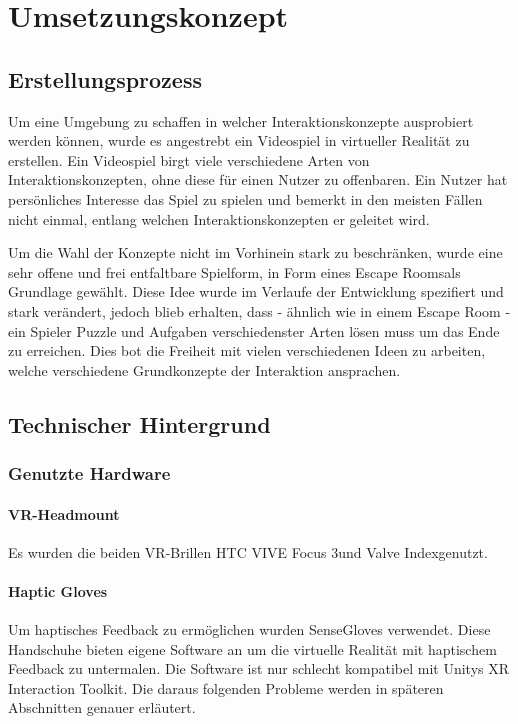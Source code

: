 \chapter{Umsetzungskonzept}

\section{Erstellungsprozess}
Um eine Umgebung zu schaffen in welcher Interaktionskonzepte ausprobiert werden können, wurde es angestrebt ein Videospiel in virtueller Realität zu erstellen. Ein Videospiel birgt viele verschiedene Arten von Interaktionskonzepten, ohne diese für einen Nutzer zu offenbaren. Ein Nutzer hat persönliches Interesse das Spiel zu spielen und bemerkt in den meisten Fällen nicht einmal, entlang welchen Interaktionskonzepten er geleitet wird.

Um die Wahl der Konzepte nicht im Vorhinein stark zu beschränken, wurde eine sehr offene und frei entfaltbare Spielform, in Form eines \dq Escape Rooms\dq als Grundlage gewählt. Diese Idee wurde im Verlaufe der Entwicklung spezifiert und stark verändert, jedoch blieb erhalten, dass - ähnlich wie in einem Escape Room - ein Spieler Puzzle und Aufgaben verschiedenster Arten lösen muss um das Ende zu erreichen. Dies bot die Freiheit mit vielen verschiedenen Ideen zu arbeiten, welche verschiedene Grundkonzepte der Interaktion ansprachen.


\section{Technischer Hintergrund}

\subsection{Genutzte Hardware}

\subsubsection{VR-Headmount}
Es wurden die beiden VR-Brillen \dq HTC VIVE Focus 3\dq und \dq Valve Index\dq genutzt.

\subsubsection{Haptic Gloves}
Um haptisches Feedback zu ermöglichen wurden \dq SenseGloves \dq verwendet. Diese Handschuhe bieten eigene Software an um die virtuelle Realität mit haptischem Feedback zu untermalen. Die Software ist nur schlecht kompatibel mit Unitys XR Interaction Toolkit. Die daraus folgenden Probleme werden in späteren Abschnitten genauer erläutert. 

